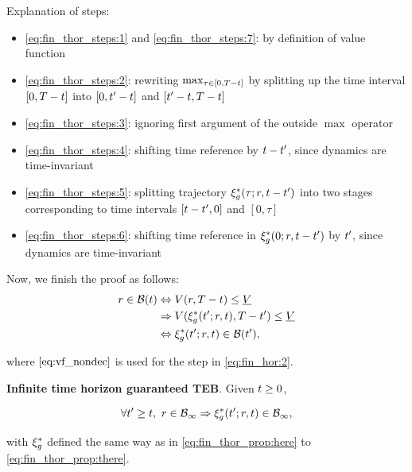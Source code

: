 \begin{IEEEproof}
Explanation of steps:
\begin{itemize}
  \item \eqref{eq:fin_thor_steps:1} and \eqref{eq:fin_thor_steps:7}: by definition of value function
  \item \eqref{eq:fin_thor_steps:2}: rewriting $\max_{\tau \in [0, T-t]}$ by splitting up the time interval $[0, T-t]$ into $[0, t'-t]$ and $[t'-t, T-t]$
  \item \eqref{eq:fin_thor_steps:3}: ignoring first argument of the outside $\max$ operator
  \item \eqref{eq:fin_thor_steps:4}: shifting time reference by $t-t'$, since dynamics are time-invariant
  \item \eqref{eq:fin_thor_steps:5}: splitting trajectory $\xi_g^*(\tau; r, t-t')$ into two stages corresponding to time intervals $[t-t', 0]$ and $[0, \tau]$
  \item \eqref{eq:fin_thor_steps:6}: shifting time reference in $\xi_g^*(0; r, t-t')$ by $t'$, since dynamics are time-invariant
\end{itemize}

Now, we finish the proof as follows:
\begin{subequations} \label{eq:fin_hor}
  \begin{align}
  \rstate \in \TEB(\tvar) &\Leftrightarrow \valfunc(\rstate, \thor - \tvar) \le \underline\valfunc \\
  & \Rightarrow  \valfunc(\rtraj^*(\tvar'; \rstate, \tvar), \thor - \tvar') \le \underline\valfunc \label{eq:fin_hor:2}\\
  & \Leftrightarrow \rtraj^*(\tvar'; \rstate, \tvar) \in \TEB(\tvar'),
  \end{align}
\end{subequations}

\noindent where $\eqref{eq:vf_nondec}$ is used for the step in \eqref{eq:fin_hor:2}.

\end{IEEEproof} 

 \begin{prop}
   \label{prop:main}
   \textbf{Infinite time horizon guaranteed TEB}. Given $t \ge 0$,
   
   \begin{equation}
     \forall t' \ge t, ~r\in\mathcal B_\infty \Rightarrow \xi_g^*(t'; r, t) \in \mathcal B_\infty,
   \end{equation}
   
   \noindent with $\xi_g^*$ defined the same way as in \eqref{eq:fin_thor_prop:here} to \eqref{eq:fin_thor_prop:there}.
   
 \end{prop}


